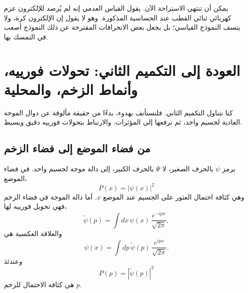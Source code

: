 \begin{classroomqa}
\end{classroomqa}

\begin{classroomqa}
\end{classroomqa}

يمكن أن تنتهي الاستراحة الآن. يقول القياس العدمي إنه لم يُرصد للإلكترون عزم كهربائي ثنائي القطب عند الحساسية المذكورة. وهو لا يقول إن الإلكترون كرة، ولا ينسف النموذج القياسي؛ بل يجعل بعض الانحرافات المقترحة عن ذلك النموذج أصعب في التمسك بها.

\section{العودة إلى التكميم الثاني: تحولات فورييه، وأنماط الزخم، والمحلية}

كنا نتناول التكميم الثاني. فلنستأنف بهدوء، بدءًا من حقيقة مألوفة عن دوال الموجة العادية لجسيم واحد، ثم نرفعها إلى المؤثرات. والارتباط بتحولات فورييه دقيق وبسيط.

\subsection{من فضاء الموضع إلى فضاء الزخم}

يرمز \(\psi\) بالحرف الصغير، لا \(\Psi\) بالحرف الكبير، إلى دالة موجة لجسيم واحد. في فضاء الموضع،
\begin{equation}
P(x)=|\psi(x)|^2
\end{equation}
وهي كثافة احتمال العثور على الجسيم عند الموضع \(x\). أما دالة الموجة في فضاء الزخم فهي تحويل فورييه لها،
\begin{equation}
\tilde{\psi}(p)=\int dx\,\psi(x)\,\frac{e^{-ipx}}{\sqrt{2\pi}},
\end{equation}
والعلاقة العكسية هي
\begin{equation}
\psi(x)=\int dp\,\tilde{\psi}(p)\,\frac{e^{ipx}}{\sqrt{2\pi}}.
\end{equation}
وعندئذ
\begin{equation}
P(p)=|\tilde{\psi}(p)|^2
\end{equation}
هي كثافة الاحتمال للزخم \(p\).

